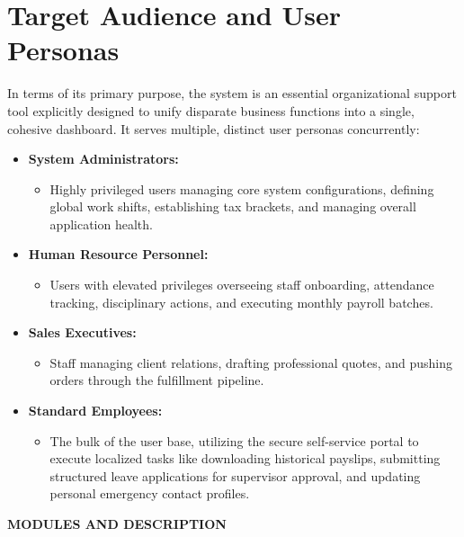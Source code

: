 ﻿\documentclass[12pt,a4paper]{report}
\begin{document}
\section*{Target Audience and User Personas}
In terms of its primary purpose, the system is an essential organizational support tool explicitly designed to unify disparate business functions into a single, cohesive dashboard. It serves multiple, distinct user personas concurrently:
\begin{itemize}
    \item \textbf{System Administrators:}
    \begin{itemize}
        \item Highly privileged users managing core system configurations, defining global work shifts, establishing tax brackets, and managing overall application health.
    \end{itemize}
    \item \textbf{Human Resource Personnel:}
    \begin{itemize}
        \item Users with elevated privileges overseeing staff onboarding, attendance tracking, disciplinary actions, and executing monthly payroll batches.
    \end{itemize}
    \item \textbf{Sales Executives:}
    \begin{itemize}
        \item Staff managing client relations, drafting professional quotes, and pushing orders through the fulfillment pipeline.
    \end{itemize}
    \item \textbf{Standard Employees:}
    \begin{itemize}
        \item The bulk of the user base, utilizing the secure self-service portal to execute localized tasks like downloading historical payslips, submitting structured leave applications for supervisor approval, and updating personal emergency contact profiles.
    \end{itemize}
\end{itemize}

\newpage
\vspace*{\fill}
\begin{center}
{\LARGE \textbf{MODULES AND DESCRIPTION}}
\end{center}
\vspace*{\fill}
\end{document}
